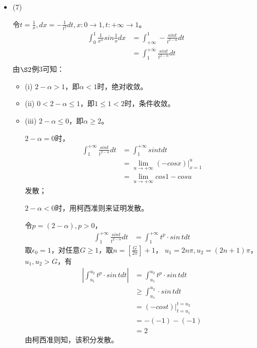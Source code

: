 \documentclass{article}
\begin{document}
\begin{itemize}
  \item (7)

        令$t = \frac{1}{x}, dx = - \frac{1}{t^2} dt, x : 0 \to 1, t : +\infty \to 1$。
        \begin{align*}
          \int_{0}^{1} \frac{1}{x^{\alpha}} sin \frac{1}{x} dx
           & = \int_{+\infty}^{1} - \frac{sin t}{t^{2 - \alpha}} dt \\
           & = \int_{1}^{+\infty} \frac{sin t}{t^{2 - \alpha}} dt   \\
        \end{align*}
        由$\S 2$例3可知：

        \begin{itemize}
          \item (i) $2 - \alpha > 1$，即$\alpha < 1$时，绝对收敛。
          \item (ii) $0 < 2 - \alpha \leq 1$，即$1 \leq 1 < 2$时，条件收敛。
          \item (iii) $2 - \alpha \leq 0$，即$\alpha \geq 2$。

                $2 - \alpha = 0$时，
                \begin{align*}
                  \int_{1}^{+\infty} \frac{sin t}{t^{2 - \alpha}} dt
                   & = \int_{1}^{+\infty} sin t dt                             \\
                   & = \lim\limits_{u \to +\infty} (- cos x)\bigg|_{x = 1}^{u} \\
                   & = \lim\limits_{u \to +\infty} cos 1 - cos u
                \end{align*}
                发散；

                $2 - \alpha < 0$时，用柯西准则来证明发散。

                令$p = (2 - \alpha), p > 0$，
                \begin{align*}
                  \int_{1}^{+\infty} \frac{sin t}{t^{2 - \alpha}} dt
                   & = \int_{1}^{+\infty} t^p \cdot sin\, t dt
                \end{align*}
                取$\epsilon_0 = 1$，对任意$G \geq 1$，取$n = \left[\frac{G}{2\pi}\right] + 1$，
                $u_1 = 2n \pi, u_2 = (2n + 1)\pi$，$u_1, u_2 > G$，有
                \begin{align*}
                  \left| \int_{u_1}^{u_2} t^p \cdot sin\, t dt \right|
                   & = \int_{u_1}^{u_2} t^p \cdot sin\, t dt \\
                   & \geq \int_{u_1}^{u_2} \cdot sin\, t dt  \\
                   & = (-cos t)\bigg|_{t = u_1}^{t = u_2}    \\
                   & = -(-1) - (-1)                          \\
                   & = 2
                \end{align*}
                由柯西准则知，该积分发散。


\end{itemize}
\end{itemize}
\end{document}
